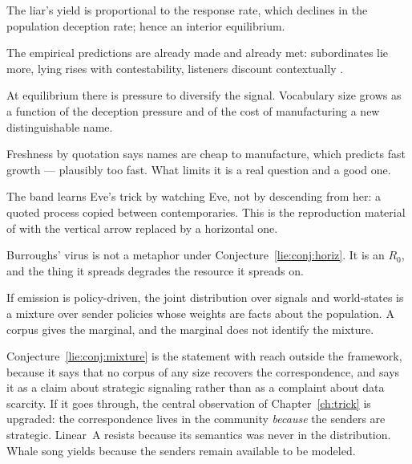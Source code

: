 \begin{conjecture}
\label{lie:conj:equil}
The liar's yield is proportional to the response rate, which declines in the
population deception rate; hence an interior equilibrium.
\end{conjecture}

The empirical predictions are already made and already met: subordinates lie
more, lying rises with contestability, listeners discount contextually
\cite{wheelerbc2009,wheelerbc2010}.

\begin{conjecture}
\label{lie:conj:elab}
At equilibrium there is pressure to diversify the signal. Vocabulary size grows
as a function of the deception pressure and of the cost of manufacturing a new
distinguishable name.
\end{conjecture}

Freshness by quotation says names are cheap to manufacture, which predicts fast
growth --- plausibly too fast. What limits it is a real question and a good one.

\begin{conjecture}
\label{lie:conj:horiz}
The band learns Eve's trick by watching Eve, not by descending from her: a quoted
process copied between contemporaries. This is the reproduction material of
\chSci with the vertical arrow replaced by a horizontal one.
\end{conjecture}

Burroughs' virus is not a metaphor under Conjecture~\ref{lie:conj:horiz}. It is
an $R_{0}$, and the thing it spreads degrades the resource it spreads on.

\begin{conjecture}
\label{lie:conj:mixture}
If emission is policy-driven, the joint distribution over signals and
world-states is a mixture over sender policies whose weights are facts about the
population. A corpus gives the marginal, and the marginal does not identify the
mixture.
\end{conjecture}

Conjecture~\ref{lie:conj:mixture} is the statement with reach outside the
framework, because it says that no corpus of any size recovers the
correspondence, and says it as a claim about strategic signaling rather than as a
complaint about data scarcity. If it goes through, the central observation of
Chapter~\ref{ch:trick} is upgraded: the correspondence lives in the community
\emph{because} the senders are strategic. Linear~A resists because its semantics
was never in the distribution. Whale song yields because the senders remain
available to be modeled.

